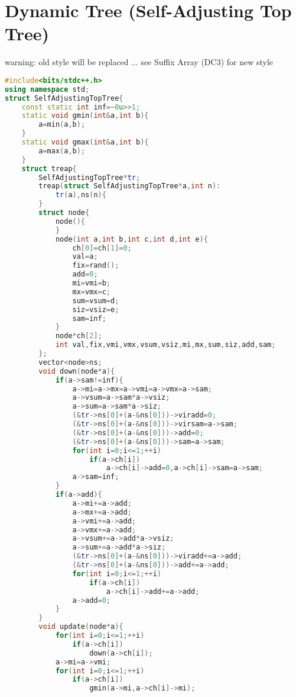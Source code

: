 \documentclass{book}
\begin{document}
\section{Dynamic Tree (Self-Adjusting Top Tree)}
warning: old style will be replaced ... see Suffix Array (DC3) for new style\begin{lstlisting}[language=C++,title={Dynamic Tree (Self-Adjusting Top Tree).hpp (12629 bytes, 443 lines)}]
#include<bits/stdc++.h>
using namespace std;
struct SelfAdjustingTopTree{
    const static int inf=~0u>>1;
    static void gmin(int&a,int b){
        a=min(a,b);
    }
    static void gmax(int&a,int b){
        a=max(a,b);
    }
    struct treap{
        SelfAdjustingTopTree*tr;
        treap(struct SelfAdjustingTopTree*a,int n):
            tr(a),ns(n){
        }
        struct node{
            node(){
            }
            node(int a,int b,int c,int d,int e){
                ch[0]=ch[1]=0;
                val=a;
                fix=rand();
                add=0;
                mi=vmi=b;
                mx=vmx=c;
                sum=vsum=d;
                siz=vsiz=e;
                sam=inf;
            }
            node*ch[2];
            int val,fix,vmi,vmx,vsum,vsiz,mi,mx,sum,siz,add,sam;
        };
        vector<node>ns;
        void down(node*a){
            if(a->sam!=inf){
                a->mi=a->mx=a->vmi=a->vmx=a->sam;
                a->vsum=a->sam*a->vsiz;
                a->sum=a->sam*a->siz;
                (&tr->ns[0]+(a-&ns[0]))->viradd=0;
                (&tr->ns[0]+(a-&ns[0]))->virsam=a->sam;
                (&tr->ns[0]+(a-&ns[0]))->add=0;
                (&tr->ns[0]+(a-&ns[0]))->sam=a->sam;
                for(int i=0;i<=1;++i)
                    if(a->ch[i])
                        a->ch[i]->add=0,a->ch[i]->sam=a->sam;
                a->sam=inf;
            }
            if(a->add){
                a->mi+=a->add;
                a->mx+=a->add;
                a->vmi+=a->add;
                a->vmx+=a->add;
                a->vsum+=a->add*a->vsiz;
                a->sum+=a->add*a->siz;
                (&tr->ns[0]+(a-&ns[0]))->viradd+=a->add;
                (&tr->ns[0]+(a-&ns[0]))->add+=a->add;
                for(int i=0;i<=1;++i)
                    if(a->ch[i])
                        a->ch[i]->add+=a->add;
                a->add=0;
            }
        }
        void update(node*a){
            for(int i=0;i<=1;++i)
                if(a->ch[i])
                    down(a->ch[i]);
            a->mi=a->vmi;
            for(int i=0;i<=1;++i)
                if(a->ch[i])
                    gmin(a->mi,a->ch[i]->mi);

\end{lstlisting}
\end{document}
